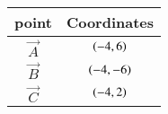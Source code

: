\begin{tabular}{ |c| c|}
    \hline
    \textbf{point}  &  \textbf{Coordinates}\\
    \hline
    $\vec{A}$ & $\left(-4,6\right)$ \\
    \hline
    $\vec{B}$ & $\left(-4,-6\right)$\\
    \hline
    $\vec{C}$ & $\left(-4,2\right)$\\
    \hline
\end{tabular}    

